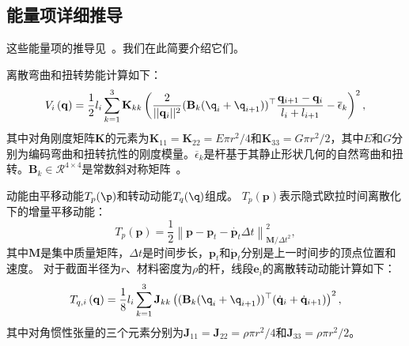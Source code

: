 \subsection{能量项详细推导}
\label{app:energies}
这些能量项的推导见~\cite{spillmann_corde_2007}。我们在此简要介绍它们。

离散弯曲和扭转势能计算如下：
\begin{equation}
 V_{i}\left(\mathbf{q}\right) = \frac{1}{2}l_i\sum_{k=1}^3 \mathbf{K}_{kk}\left(\frac{2}{||\mathbf{q}_i||^2} (\mathbf{B}_k(\q_i+\q_{i+1}))^{\top}\frac{\mathbf{q}_{i+1} -  \mathbf{q}_{i}}{l_i+l_{i+1}}- \overline{\epsilon}_k\right)^2,
 \label{eq:V_q}
\end{equation}
其中对角刚度矩阵$\mathbf K$的元素为$\mathbf K_{11} = \mathbf{K}_{22} =  E\pi r^2/4$和$\mathbf K_{33} = G\pi r^2/2$，其中$E$和$G$分别为编码弯曲和扭转抗性的刚度模量。$\overline{\epsilon}_k$是杆基于其静止形状几何的自然弯曲和扭转。$\mathbf B_k \in \mathcal R^{4\times 4}$是常数斜对称矩阵~\cite{spillmann_corde_2007}。

动能由平移动能$T_p(\p)$和转动动能$T_q(\q)$组成。
$T_p\left(\mathbf p \right)$表示隐式欧拉时间离散化下的增量平移动能：
\begin{equation}
  T_p\left(\mathbf p \right)=\frac{1}{2}\left\|\mathbf{p}-\mathbf{p}_{t}-\dot{\mathbf{p}_{t}}\Delta t\right\|_{\mathbf{M} / \Delta t^{2}}^{2},
\end{equation}
其中$\mathbf{M}$是集中质量矩阵，$\Delta t$是时间步长，$\mathbf{p}_{t}$和$\dot{\mathbf{p}}_{t}$分别是上一时间步的顶点位置和速度。
对于截面半径为$r$、材料密度为$\rho$的杆，线段$\mathbf{e}_i$的离散转动动能计算如下：
\begin{equation}
 T_{q,i}\left(\mathbf{q}\right)= \frac{1}{8}l_i\sum_{k=1}^3 \mathbf{J}_{kk}\left( (\mathbf{B}_k(\q_i+\q_{i+1}))^{\top}(\dot{\mathbf{q}}_i+  \dot{\mathbf{q}}_{i+1} ) \right)^2,
 \label{eq:T_q}
\end{equation}
其中对角惯性张量的三个元素分别为$\mathbf{J}_{11}=\mathbf{J}_{22}=\rho\pi r^2/4$和$\mathbf{J}_{33}=\rho\pi r^2/2$。

